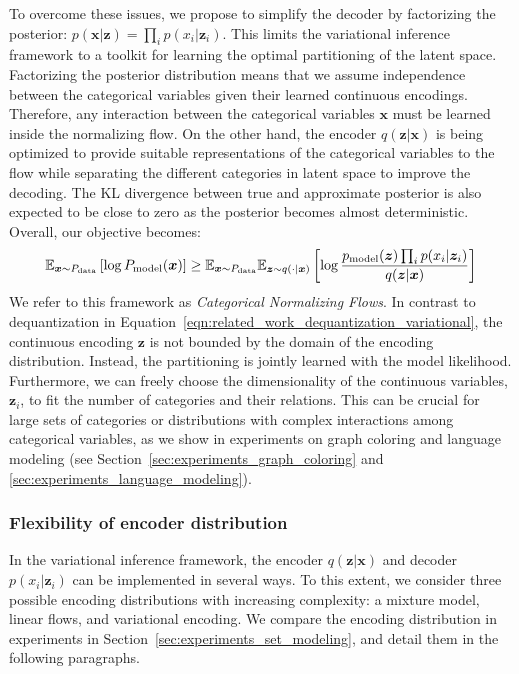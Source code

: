 To overcome these issues, we propose to simplify the decoder by factorizing the posterior: $p(\bm{x}|\bm{z})=\prod_i p(x_i|\bm{z}_i)$. 
This limits the variational inference framework to a toolkit for learning the optimal partitioning of the latent space. 
Factorizing the posterior distribution means that we assume independence between the categorical variables given their learned continuous encodings. 
Therefore, any interaction between the categorical variables $\bm{x}$ must be learned inside the normalizing flow.
On the other hand, the encoder $q(\bm{z}|\bm{x})$ is being optimized to provide suitable representations of the categorical variables to the flow while separating the different categories in latent space to improve the decoding. The KL divergence between true and approximate posterior is also expected to be close to zero as the posterior becomes almost deterministic. 
Overall, our objective becomes:
\begin{equation}
	\mathbb{E}_{\bm{x}\sim P_{\text{data}}}\left[\log P_{\text{model}}(\bm{x})\right] \geq \mathbb{E}_{\bm{x}\sim P_{\text{data}}}\mathbb{E}_{\bm{z}\sim q(\cdot|\bm{x})}\left[\log \frac{p_{\text{model}}(\bm{z}) \prod_i p(x_i|\bm{z}_i)}{q(\bm{z}|\bm{x})}\right]
\end{equation}
We refer to this framework as \emph{Categorical Normalizing Flows}. In contrast to dequantization in Equation~\ref{eqn:related_work_dequantization_variational}, the continuous encoding $\bm{z}$ is not bounded by the domain of the encoding distribution. 
Instead, the partitioning is jointly learned with the model likelihood. 
Furthermore, we can freely choose the dimensionality of the continuous variables, $\bm{z}_i$, to fit the number of categories and their relations. 
This can be crucial for large sets of categories or distributions with complex interactions among categorical variables, as we show in experiments on graph coloring and language modeling (see Section~\ref{sec:experiments_graph_coloring} and \ref{sec:experiments_language_modeling}).

\subsubsection{Flexibility of encoder distribution}

In the variational inference framework, the encoder $q(\bm{z}|\bm{x})$ and decoder $p(x_i|\bm{z}_i)$ can be implemented in several ways. 
To this extent, we consider three possible encoding distributions with increasing complexity: a mixture model, linear flows, and variational encoding. 
We compare the encoding distribution in experiments in Section~\ref{sec:experiments_set_modeling}, and detail them in the following paragraphs.

